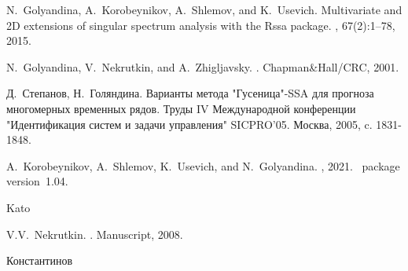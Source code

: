 \documentclass{spisok-article}
\begin{document}
\renewcommand\refname{Литература}


\begin{thebibliography}{10}

N.~Golyandina, A.~Korobeynikov, A.~Shlemov, and K.~Usevich.
\newblock Multivariate and {2D} extensions of singular spectrum analysis with
  the {R}ssa package.
, 67(2):1--78, 2015.

N.~Golyandina, V.~Nekrutkin, and A.~Zhigljavsky.
.
\newblock Chapman\&Hall/CRC, 2001.

Д.~Степанов, Н.~Голяндина.
\newblock Варианты метода "Гусеница"{-SSA} для прогноза многомерных временных рядов.
\newblock Труды IV Международной конференции "Идентификация систем и задачи управления" { SICPRO'05}. Москва, 2005, c. 1831-1848.

A.~Korobeynikov, A.~Shlemov, K.~Usevich, and N.~Golyandina.
, 2021.
~package version~1.04.

Kato

V.V.~Nekrutkin.
.
\newblock Manuscript, 2008.

Константинов

\end{thebibliography}
\end{document}
